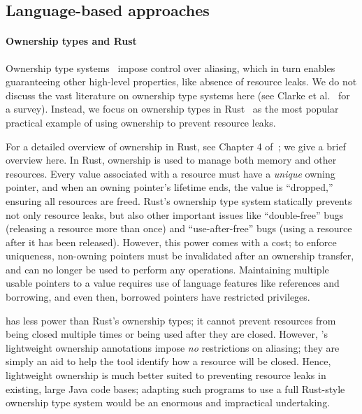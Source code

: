 


\subsection{Language-based approaches}\label{sec:rw-language}

\paragraph{Ownership types and Rust} Ownership type
systems~\cite{clarke2013ownership} impose control over aliasing, which
in turn enables guaranteeing other high-level properties, like absence of
resource leaks.  We do not discuss the vast literature on ownership type systems
here (see Clarke et al.~\cite{clarke2013ownership} for a survey). Instead, we
focus on ownership types in Rust~\cite{klabnik2018rust} as the most popular
practical example of using ownership to prevent resource leaks.

For a detailed overview of ownership in Rust, see Chapter 4
of~\cite{klabnik2018rust}; we give a brief overview here.  In Rust, ownership is
used to manage both memory and other resources.  Every value associated with a
resource must have a \emph{unique} owning pointer, and when an owning pointer's
lifetime ends, the value is ``dropped,'' ensuring all resources are freed.
Rust's ownership type system statically prevents
not only resource leaks, but also other important issues like ``double-free'' bugs
(releasing a resource more than once) and ``use-after-free'' bugs (using a
resource after it has been released). However, this power comes with a cost; to
enforce uniqueness, non-owning pointers must be invalidated after an ownership transfer,
and can no longer be used to perform any operations.  Maintaining multiple
usable pointers to a value requires use of language features like references and
borrowing, and even then, borrowed pointers have restricted privileges.

\Tool has less power than Rust's ownership types; it cannot prevent resources
from being closed multiple times or being used after they are closed.  However,
\Tool's lightweight ownership annotations impose \emph{no} restrictions on
aliasing; they are simply an aid to help the tool identify how a resource will
be closed.  Hence, lightweight ownership is much better suited to preventing
resource leaks in existing, large Java code bases; adapting such programs to use
a full Rust-style ownership type system would be an enormous and impractical
undertaking.

